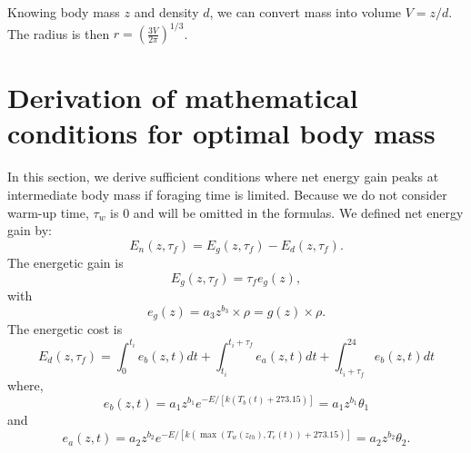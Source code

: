 \documentclass[11pt]{article}
\begin{document}
Knowing body mass $z$ and density $d$, we can convert mass into volume $ V = z/d$.
The radius is then $r = \left( \frac{3V}{2 \pi} \right)^{1/3}$.

\section{Derivation of  mathematical conditions for optimal body mass}
In this section, we derive sufficient conditions where net energy gain peaks at intermediate body mass if foraging time is limited.
Because we do not consider warm-up time, $\tau_w $ is 0 and  will be omitted in the formulas.
We defined net energy gain by:
\begin{equation} \label{eq:main}
	E_n(z, \tau_f) = E_g(z,\tau_f) - E_d(z, \tau_f).
\end{equation}
The energetic gain is
\[
	E_g(z,\tau_f) = \tau_f e_g(z),
\]
with
\begin{equation} \label{eq:eg}
	e_g(z) = a_3 z^{b_3} \times \rho  = g(z) \times \rho.
\end{equation}
%
The energetic cost is
\begin{equation} \label{eq:ed}
	E_d(z, \tau_f) = \int_0^{t_i} e_b(z, t) dt + \int_{t_i}^{t_i + \tau_f } e_a(z,t) dt + \int_{t_i+\tau_f}^{24} e_b(z, t) dt
\end{equation}
where,
\begin{equation} \label{eq:eb}
	e_b(z, t) = a_1 z^{b_1} e^{-E/[k (T_b(t)+ 273.15)]} =  a_1 z^{b_1} \theta_1
\end{equation}
and
\begin{equation} \label{eq:ea}
	e_a(z,t) = a_2 z^{b_2}  e^{-E/[k (\max(T_w(z_{th}), T_e(t))+ 273.15)]} =  a_2 z^{b_2} \theta_2.
\end{equation}
\end{document}
